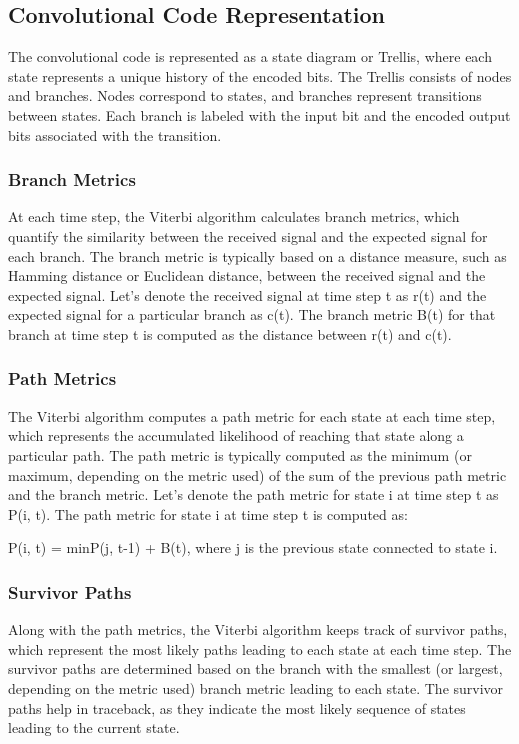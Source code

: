 \subsection{Convolutional Code Representation}

The convolutional code is represented as a state diagram or Trellis, where each state represents a unique history of the encoded bits.
The Trellis consists of nodes and branches. Nodes correspond to states, and branches represent transitions between states.
Each branch is labeled with the input bit and the encoded output bits associated with the transition.

\subsubsection{Branch Metrics}
At each time step, the Viterbi algorithm calculates branch metrics, which quantify the similarity between the received signal and the expected signal for each branch.
The branch metric is typically based on a distance measure, such as Hamming distance or Euclidean distance, between the received signal and the expected signal.
Let's denote the received signal at time step t as r(t) and the expected signal for a particular branch as c(t). The branch metric B(t) for that branch at time step t is computed as the distance between r(t) and c(t).

\subsubsection{Path Metrics}
The Viterbi algorithm computes a path metric for each state at each time step, which represents the accumulated likelihood of reaching that state along a particular path.
The path metric is typically computed as the minimum (or maximum, depending on the metric used) of the sum of the previous path metric and the branch metric.
Let's denote the path metric for state i at time step t as P(i, t). The path metric for state i at time step t is computed as:
\begin{center}
P(i, t) = min{P(j, t-1) + B(t)}, where j is the previous state connected to state i.
\end{center}

\subsubsection{Survivor Paths}
Along with the path metrics, the Viterbi algorithm keeps track of survivor paths, which represent the most likely paths leading to each state at each time step.
The survivor paths are determined based on the branch with the smallest (or largest, depending on the metric used) branch metric leading to each state.
The survivor paths help in traceback, as they indicate the most likely sequence of states leading to the current state.

